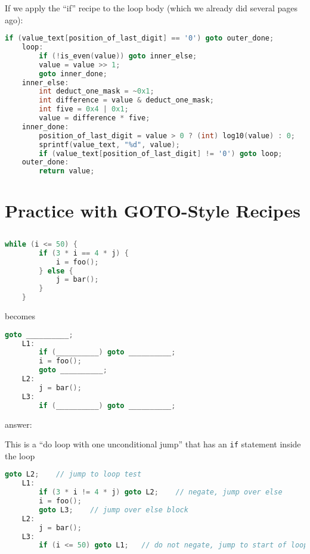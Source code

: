 \documentclass{article}
\begin{document}
If we apply the ``if'' recipe to the loop body (which we already did several pages ago):

\begin{lstlisting}[language=C, linebackgroundcolor={
    %    \ifodd\value{lstnumber}\color{green}\fi
    \ifnum\value{lstnumber}=1 \color{lime}\fi,
    \ifnum\value{lstnumber}=2 \color{green}\fi,
    \ifnum\value{lstnumber}=14 \color{green}\fi,
    \ifnum\value{lstnumber}=15 \color{lime}\fi,
    \ifnum\value{lstnumber}=3 \color{pink}\fi,
    \ifnum\value{lstnumber}=5 \color{pink}\fi,
    \ifnum\value{lstnumber}=6 \color{pink}\fi,
    \ifnum\value{lstnumber}=11 \color{pink}\fi,
}]
        if (value_text[position_of_last_digit] == '0') goto outer_done;
    loop:
        if (!is_even(value)) goto inner_else;
        value = value >> 1;
        goto inner_done;
    inner_else:
        int deduct_one_mask = ~0x1;
        int difference = value & deduct_one_mask;
        int five = 0x4 | 0x1;
        value = difference * five;
    inner_done:
        position_of_last_digit = value > 0 ? (int) log10(value) : 0;
        sprintf(value_text, "%d", value);
        if (value_text[position_of_last_digit] != '0') goto loop;
    outer_done:
        return value;
\end{lstlisting}

\newpage
\section{Practice with GOTO-Style Recipes}

\subsection{}

\begin{lstlisting}[language=C]
    while (i <= 50) {
        if (3 * i == 4 * j) {
            i = foo();
        } else {
            j = bar();
        }
    }
\end{lstlisting}

becomes

\begin{lstlisting}[language=C]
        goto __________;
    L1:
        if (__________) goto __________;
        i = foo();
        goto __________;
    L2:
        j = bar();
    L3:
        if (__________) goto __________;
\end{lstlisting}

answer:

This is a ``do loop with one unconditional jump'' that has an \lstinline{if} statement inside the loop
\begin{lstlisting}[language=C]
        goto L2;    // jump to loop test
    L1:
        if (3 * i != 4 * j) goto L2;    // negate, jump over else
        i = foo();
        goto L3;    // jump over else block
    L2:
        j = bar();
    L3:
        if (i <= 50) goto L1;   // do not negate, jump to start of loop
\end{lstlisting}
\end{document}

